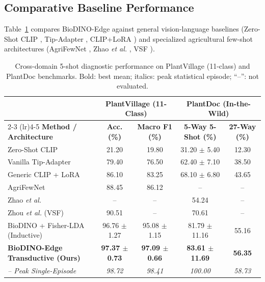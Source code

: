 \documentclass[a4paper,fleqn,nologo]{cas-dc}
\begin{document}
\subsection{Comparative Baseline Performance}
\label{sec:comparative_results}
Table~\ref{tab:comparative} compares BioDINO-Edge against general vision-language baselines (Zero-Shot CLIP \cite{radford2021clip}, Tip-Adapter \cite{zhang2022tip}, CLIP+LoRA \cite{hu2022lora}) and specialized agricultural few-shot architectures (AgriFewNet \cite{babu2025agrifewnet}, Zhao \textit{et al.} \cite{zhao2026lightweight}, VSF \cite{zhou2026vsf}).

\begin{table}[htbp]
\centering
\caption{Cross-domain 5-shot diagnostic performance on PlantVillage (11-class) and PlantDoc benchmarks. Bold: best mean; italics: peak statistical episode; ``--'': not evaluated.}
\label{tab:comparative}
\small
\begin{tabularx}{\textwidth}{lcccc}
\toprule
& \multicolumn{2}{c}{\textbf{PlantVillage (11-Class)}} & \multicolumn{2}{c}{\textbf{PlantDoc (In-the-Wild)}} \\
\cmidrule(lr){2-3} \cmidrule(lr){4-5}
\textbf{Method / Architecture} & \textbf{Acc. (\%)} & \textbf{Macro F1 (\%)} & \textbf{5-Way 5-Shot (\%)} & \textbf{27-Way (\%)} \\
\midrule
Zero-Shot CLIP \cite{radford2021clip} & 21.20 & 19.80 & 31.20 $\pm$ 5.40 & 12.30 \\
Vanilla Tip-Adapter \cite{zhang2022tip} & 79.40 & 76.50 & 62.40 $\pm$ 7.10 & 38.50 \\
Generic CLIP + LoRA \cite{hu2022lora} & 86.10 & 83.25 & 68.10 $\pm$ 6.80 & 43.65 \\
AgriFewNet \cite{babu2025agrifewnet} & 88.45 & 86.12 & -- & -- \\
Zhao \textit{et al.} \cite{zhao2026lightweight} & -- & -- & 54.24 & -- \\
Zhou \textit{et al.} (VSF) \cite{zhou2026vsf} & 90.51 & -- & 70.61 & -- \\
\midrule
BioDINO + Fisher-LDA (Inductive) & 96.76 $\pm$ 1.27 & 95.08 $\pm$ 1.15 & 81.79 $\pm$ 11.16 & 55.16 \\
\textbf{BioDINO-Edge Transductive (Ours)} & \textbf{97.37 $\pm$ 0.73} & \textbf{97.09 $\pm$ 0.66} & \textbf{83.61 $\pm$ 11.69} & \textbf{56.35} \\
\textit{-- Peak Single-Episode} & \textit{98.72} & \textit{98.41} & \textit{100.00} & \textit{58.73} \\
\bottomrule
\end{tabularx}
\end{table}
\end{document}
